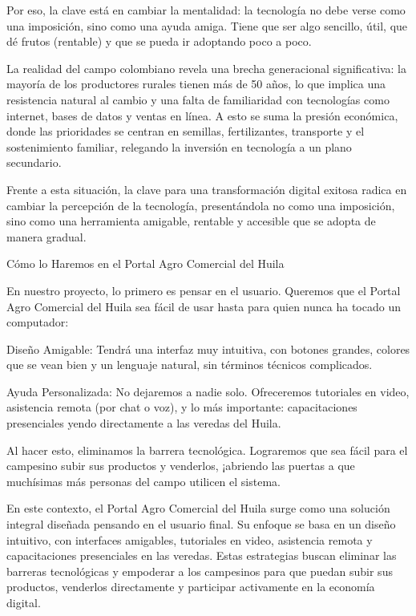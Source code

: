 Por eso, la clave está en cambiar la mentalidad: la tecnología no debe verse como una imposición, sino como una ayuda amiga. Tiene que ser algo sencillo, útil, que dé frutos (rentable) y que se pueda ir adoptando poco a poco.

La realidad del campo colombiano revela una brecha generacional significativa: la mayoría de los productores rurales tienen más de 50 años, lo que implica una resistencia natural al cambio y una falta de familiaridad con tecnologías como internet, bases de datos y ventas en línea. A esto se suma la presión económica, donde las prioridades se centran en semillas, fertilizantes, transporte y el sostenimiento familiar, relegando la inversión en tecnología a un plano secundario.

Frente a esta situación, la clave para una transformación digital exitosa radica en cambiar la percepción de la tecnología, presentándola no como una imposición, sino como una herramienta amigable, rentable y accesible que se adopta de manera gradual.

Cómo lo Haremos en el Portal Agro Comercial del Huila

En nuestro proyecto, lo primero es pensar en el usuario. Queremos que el Portal Agro Comercial del Huila sea fácil de usar hasta para quien nunca ha tocado un computador:

Diseño Amigable: Tendrá una interfaz muy intuitiva, con botones grandes, colores que se vean bien y un lenguaje natural, sin términos técnicos complicados.

Ayuda Personalizada: No dejaremos a nadie solo. Ofreceremos tutoriales en video, asistencia remota (por chat o voz), y lo más importante: capacitaciones presenciales yendo directamente a las veredas del Huila.

Al hacer esto, eliminamos la barrera tecnológica. Lograremos que sea fácil para el campesino subir sus productos y venderlos, ¡abriendo las puertas a que muchísimas más personas del campo utilicen el sistema.

En este contexto, el Portal Agro Comercial del Huila surge como una solución integral diseñada pensando en el usuario final. Su enfoque se basa en un diseño intuitivo, con interfaces amigables, tutoriales en video, asistencia remota y capacitaciones presenciales en las veredas. Estas estrategias buscan eliminar las barreras tecnológicas y empoderar a los campesinos para que puedan subir sus productos, venderlos directamente y participar activamente en la economía digital.

